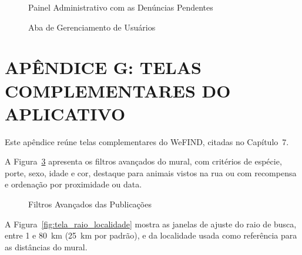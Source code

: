 \begin{figure}[H]
    \centering
    \caption{Painel Administrativo com as Denúncias Pendentes}
    \label{fig:painel_denuncias}
\end{figure}

\begin{figure}[H]
    \centering
    \caption{Aba de Gerenciamento de Usuários}
    \label{fig:administracao_usuarios}
\end{figure}

\clearpage

\section*{APÊNDICE G: TELAS COMPLEMENTARES DO APLICATIVO}
\label{apendice:telas-complementares}

Este apêndice reúne telas complementares do WeFIND, citadas no Capítulo~7.

\renewcommand{\thefigure}{G\arabic{figure}}
\renewcommand{\theHfigure}{G\arabic{figure}}
\setcounter{figure}{0}

A Figura~\ref{fig:tela_filtros_avancados} apresenta os filtros avançados do mural, com critérios de espécie, porte, sexo, idade e cor, destaque para animais vistos na rua ou com recompensa e ordenação por proximidade ou data.

\begin{figure}[H]
    \centering
    \caption{Filtros Avançados das Publicações}
    \label{fig:tela_filtros_avancados}
\end{figure}

A Figura~\ref{fig:tela_raio_localidade} mostra as janelas de ajuste do raio de busca, entre 1 e 80~km (25~km por padrão), e da localidade usada como referência para as distâncias do mural.

